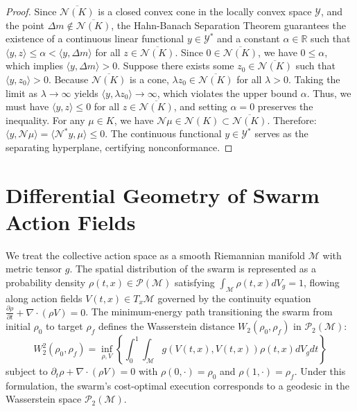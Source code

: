 \documentclass[11pt,oneside]{book}
\theoremstyle{definition}
\theoremstyle{plain}
\theoremstyle{remark}
\begin{document}
\begin{proof}
Since $\overline{\mathcal{N}(K)}$ is a closed convex cone in the locally convex space $\mathcal{Y}$, and the point $\Delta m \notin \overline{\mathcal{N}(K)}$, the Hahn-Banach Separation Theorem \cite{banach1929} guarantees the existence of a continuous linear functional $y \in \mathcal{Y}^*$ and a constant $\alpha \in \mathbb{R}$ such that $\langle y, z \rangle \le \alpha < \langle y, \Delta m \rangle$ for all $z \in \overline{\mathcal{N}(K)}$. %
Since $0 \in \overline{\mathcal{N}(K)}$, we have $0 \le \alpha$, which implies $\langle y, \Delta m \rangle > 0$. %
Suppose there exists some $z_0 \in \overline{\mathcal{N}(K)}$ such that $\langle y, z_0 \rangle > 0$. %
Because $\overline{\mathcal{N}(K)}$ is a cone, $\lambda z_0 \in \overline{\mathcal{N}(K)}$ for all $\lambda > 0$. %
Taking the limit as $\lambda \to \infty$ yields $\langle y, \lambda z_0 \rangle \to \infty$, which violates the upper bound $\alpha$. %
Thus, we must have $\langle y, z \rangle \le 0$ for all $z \in \overline{\mathcal{N}(K)}$, and setting $\alpha = 0$ preserves the inequality. %
For any $\mu \in K$, we have $\mathcal{N}\mu \in \mathcal{N}(K) \subset \overline{\mathcal{N}(K)}$. %
Therefore: $\langle y, \mathcal{N}\mu \rangle = \langle \mathcal{N}^* y, \mu \rangle \le 0$. %
The continuous functional $y \in \mathcal{Y}^*$ serves as the separating hyperplane, certifying nonconformance. %
\end{proof}

\section{Differential Geometry of Swarm Action Fields}
We treat the collective action space as a smooth Riemannian manifold $\mathcal{M}$ with metric tensor $g$. %
The spatial distribution of the swarm is represented as a probability density $\rho(t, x) \in \mathcal{P}(\mathcal{M})$ satisfying $\int_{\mathcal{M}} \rho(t, x) dV_g = 1$, flowing along action fields $V(t, x) \in T_x\mathcal{M}$ governed by the continuity equation $\frac{\partial \rho}{\partial t} + \nabla \cdot (\rho V) = 0$. %
The minimum-energy path transitioning the swarm from initial $\rho_0$ to target $\rho_f$ defines the Wasserstein distance $W_2(\rho_0, \rho_f)$ in $\mathcal{P}_2(\mathcal{M})$:
\[
W_2^2(\rho_0, \rho_f) = \inf_{\rho, V} \left\{ \int_0^1 \int_{\mathcal{M}} g(V(t,x), V(t,x)) \rho(t,x) dV_g dt \right\}
\]
subject to $\partial_t \rho + \nabla \cdot (\rho V) = 0$ with $\rho(0, \cdot) = \rho_0$ and $\rho(1, \cdot) = \rho_f$. %
Under this formulation, the swarm's cost-optimal execution corresponds to a geodesic in the Wasserstein space $\mathcal{P}_2(\mathcal{M})$. %
\end{document}
